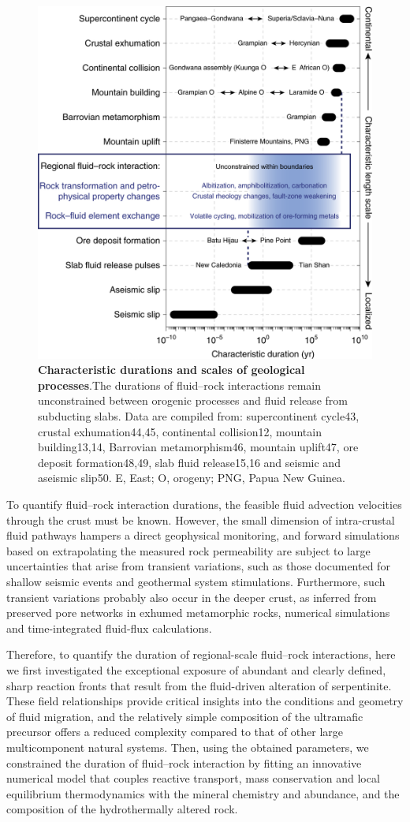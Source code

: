 \begin{figure}[ht]
	\centering
	\includegraphics[width=0.5\linewidth]{figures/fig1.png}
	\caption{\textbf{Characteristic durations and scales of geological processes}.The durations of fluid–rock interactions remain unconstrained between orogenic processes and fluid release from subducting slabs. Data are compiled from: supercontinent cycle43, crustal exhumation44,45, continental collision12, mountain building13,14, Barrovian metamorphism46, mountain uplift47, ore deposit formation48,49, slab fluid release15,16 and seismic and aseismic slip50. E, East; O, orogeny; PNG, Papua New Guinea.}
	\label{fig:fig1}
\end{figure}

To quantify fluid–rock interaction durations, the feasible fluid advection velocities through the crust must be known. However, the small dimension of intra-crustal fluid pathways hampers a direct geophysical monitoring, and forward simulations based on extrapolating the measured rock permeability are subject to large uncertainties that arise from transient variations, such as those documented for shallow seismic events and geothermal system stimulations\cite{John2012,Hanson1992,ingebritsen2010permeability}. Furthermore, such transient variations probably also occur in the deeper crust, as inferred from preserved pore networks in exhumed metamorphic rocks, numerical simulations and time-integrated fluid-flux calculations\cite{ingebritsen2010permeability,manning1999permeability,Plumper2017,Bickle1990,Skelton2011}.

Therefore, to quantify the duration of regional-scale fluid–rock interactions, here we first investigated the exceptional exposure of abundant and clearly defined, sharp reaction fronts that result from the fluid-driven alteration of serpentinite. These field relationships provide critical insights into the conditions and geometry of fluid migration, and the relatively simple composition of the ultramafic precursor offers a reduced complexity compared to that of other large multicomponent natural systems. Then, using the obtained parameters, we constrained the duration of fluid–rock interaction by fitting an innovative numerical model that couples reactive transport, mass conservation and local equilibrium thermodynamics with the mineral chemistry and abundance, and the composition of the hydrothermally altered rock.

